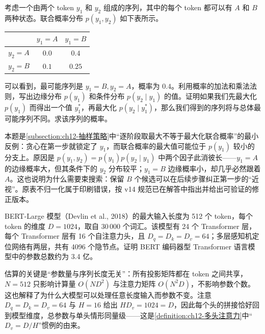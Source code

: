 \documentclass[../../main.tex]{subfiles}
\begin{document}
\begin{exercise}\label{exercise:ch12-15}
考虑一个由两个 token $y_1$ 和 $y_2$ 组成的序列，其中的每个 token 都可以有 $A$ 和 $B$ 两种状态。联合概率分布 $p(y_1,y_2)$ 如下表所示。

\begin{center}
\begin{tabular}{c|cc}
 & $y_1=A$ & $y_1=B$\\\hline
$y_2=A$ & $0.0$ & $0.4$\\
$y_2=B$ & $0.1$ & $0.25$
\end{tabular}
\end{center}

可以看到，最可能序列是 $y_1=B,y_2=A$，概率为 $0.4$。利用概率的加法和乘法法则，写出边缘分布 $p(y_1)$ 和条件分布 $p(y_2\mid y_1)$ 的值。证明如果我们先最大化 $p(y_1)$ 而得出一个值 $y_1^{*}$，再最大化 $p(y_2\mid y_1^{*})$，那么我们得到的序列将与总体最可能序列不同。求该序列的概率。
\end{exercise}

\begin{remark}
本题是\cref{subsection:ch12-抽样策略}中“逐阶段取最大不等于最大化联合概率”的最小反例：贪心在第一步就锁定了 $y_1$，而联合概率的最大值可能位于 $p(y_1)$ 较小的分支上。原因是 $p(y_1,y_2)=p(y_1)p(y_2\mid y_1)$ 中两个因子此消彼长——$y_1=A$ 的边缘概率大，但其条件下的 $y_2$ 分布较平；$y_1=B$ 边缘概率小，却几乎必然跟着 $A$。这也说明为什么需要束搜索：保留 $B$ 个候选可以在后续步骤纠正第一步的“近视”。原表不归一化属于印刷错误，按 v14 规范已在解答中指出并给出可验证的修正版本。
\end{remark}

\begin{exercise}[（$\star$）]\label{exercise:ch12-16}
BERT-Large 模型（Devlin et al., 2018）的最大输入长度为 512 个 token，每个 token 的维度 $D=1024$，取自 30\,000 个词汇。该模型有 24 个 Transformer 层，每个 Transformer 层有 16 个自注意力头，且 $D_q=D_k=D_v=64$；多层感知机定位网络有两层，共有 4096 个隐节点。证明 BERT 编码器型 Transformer 语言模型中的参数总数约为 3.4 亿。
\end{exercise}

\begin{remark}
估算的关键是“参数量与序列长度无关”：所有投影矩阵都在 token 之间共享，$N=512$ 只影响计算量 $O(ND^{2})$ 与注意力矩阵 $O(N^{2}D)$，不影响参数个数。这也解释了为什么大模型可以处理任意长度输入而参数不变。注意 $D_q=D_k=D_v=64$ 与 $H=16$ 给出 $HD_v=1024=D$，因此每个头的拼接恰好回到模型维度，总参数与单头情形同量级——这是\cref{definition:ch12-多头注意力}中“$D_v=D/H$”惯例的由来。
\end{remark}
\end{document}
